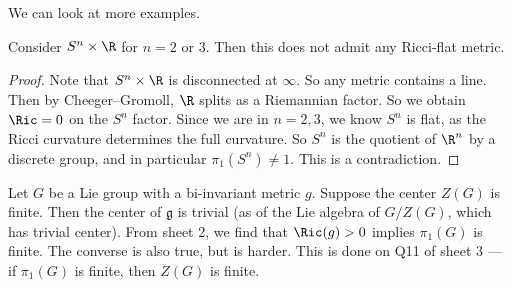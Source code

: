\documentclass[a4paper]{article}
\begin{document}
We can look at more examples.
\begin{prop}
  Consider $S^n \times \R$ for $n = 2$ or $3$. Then this does not admit any Ricci-flat metric.
\end{prop}

\begin{proof}
  Note that $S^n \times \R$ is disconnected at $\infty$. So any metric contains a line. Then by Cheeger--Gromoll, $\R$ splits as a Riemannian factor. So we obtain $\Ric = 0$ on the $S^n$ factor. Since we are in $n = 2, 3$, we know $S^n$ is flat, as the Ricci curvature determines the full curvature. So $S^n$ is the quotient of $\R^n$ by a discrete group, and in particular $\pi_1(S^n) \not= 1$. This is a contradiction.
\end{proof}

Let $G$ be a Lie group with a bi-invariant metric $g$. Suppose the center $Z(G)$ is finite. Then the center of $\mathfrak{g}$ is trivial (as of the Lie algebra of $G/Z(G)$, which has trivial center). From sheet 2, we find that $\Ric(g) > 0$ implies $\pi_1(G)$ is finite. The converse is also true, but is harder. This is done on Q11 of sheet 3 --- if $\pi_1(G)$ is finite, then $Z(G)$ is finite.

\printindex
\end{document}
